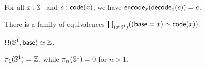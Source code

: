 \documentclass[hott-all.tex]{subfiles}
\begin{document}
% 
% 
\begin{lem}  For all
$x: \mathbb{S} ^1$ and $c : \mathsf{code}(x)$, we have $\mathsf{encode}_x({{\mathsf{decode}_x(c)}}) =_{} c$.
\end{lem}
% 
% 
%
% 
% 
% 
% 
% 
\begin{thm}
There is a family of equivalences $\prd{x : \Sn ^1} (\eqv {(\base=x)} {\code(x)})$.
\end{thm}
% 
\begin{cor}
$\Omega(\mathbb{S}^1,\mathsf{base}) \simeq \mathbb{Z}$.
\end{cor}
% 
% 
\begin{cor} 
$\pi_1(\mathbb{S} ^1) =_{} \mathbb{Z}$, while $\pi_n(\mathbb{S} ^1) =_{} 0$ for $n>1$.
\end{cor}
% 
% 
% 
\end{document}
